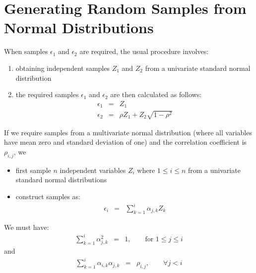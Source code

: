 \section{Generating Random Samples from Normal Distributions}
When samples $\epsilon_{1}$ and $\epsilon_{2}$ are required, the usual procedure involves:
\begin{enumerate}
	\item obtaining independent samples $Z_{1}$ and $Z_{2}$ from a univariate standard normal distribution
	\item the required samples $\epsilon_{1}$ and $\epsilon_{2}$ are then calculated as follows:
	\begin{eqnarray}
		\epsilon_{1} &=& Z_{1}\\
		\epsilon_{2} &=& \rho Z_{1} + Z_{2}\sqrt{1 - \rho^{2}}
	\end{eqnarray}
\end{enumerate}
If we require samples from a multivariate normal distribution (where all variables have mean zero and standard deviation of one) and the correlation coefficient is $\rho_{i, j}$, we
\begin{itemize}
	\item first sample $n$ independent variables $Z_{i}$ where $1 \leq i \leq n$ from a univariate standard normal distributions
	\item construct samples as:
	\begin{eqnarray}
		\epsilon_{i} &=& \sum_{k = 1}^{i}\alpha_{j, k}Z_{k}
	\end{eqnarray}
\end{itemize}
We must have:
\begin{eqnarray}
	\sum_{k = 1}^{i}\alpha_{j, k}^{2} &=& 1,\qquad\text{for } 1 \leq j \leq i
\end{eqnarray}
and
\begin{eqnarray}
	\sum_{k = 1}^{i}\alpha_{i, k}\alpha_{j, k} &=& \rho_{i, j},\qquad\forall j < i
\end{eqnarray}

